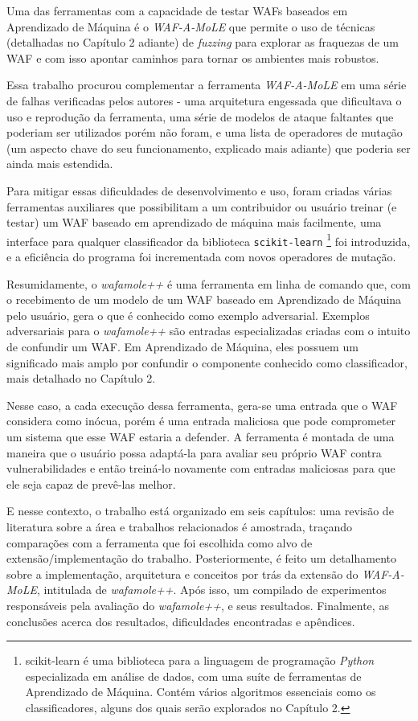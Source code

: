 Uma das ferramentas com a capacidade de testar WAFs baseados em Aprendizado de Máquina é o \textit{WAF-A-MoLE} \cite{valenza_waf--mole_2020} que permite o uso de técnicas (detalhadas no Capítulo 2 adiante) de \textit{fuzzing} \cite{fuzzing_book} para explorar as fraquezas de um WAF e com isso apontar caminhos para tornar os ambientes mais robustos.

Essa trabalho procurou complementar a ferramenta \textit{WAF-A-MoLE} em uma série de falhas verificadas pelos autores - uma arquitetura engessada que dificultava o uso e reprodução da ferramenta, uma série de modelos de ataque faltantes que poderiam ser utilizados porém não foram, e uma lista de operadores de mutação (um aspecto chave do seu funcionamento, explicado mais adiante) que poderia ser ainda mais estendida. 

Para mitigar essas dificuldades de desenvolvimento e uso, foram criadas várias ferramentas auxiliares que possibilitam a um contribuidor ou usuário treinar (e testar) um WAF baseado em aprendizado de máquina mais facilmente, uma interface para qualquer classificador da biblioteca \verb+scikit-learn+ \footnote{scikit-learn é uma biblioteca para a linguagem de programação \textit{Python} especializada em análise de dados, com uma suíte de ferramentas de Aprendizado de Máquina. Contém vários algoritmos essenciais como os classificadores, alguns dos quais serão explorados no Capítulo 2.} foi introduzida, e a eficiência do programa foi incrementada com novos operadores de mutação.

Resumidamente, o \textit{wafamole++} é uma ferramenta em linha de comando que, com o recebimento de um modelo de um WAF baseado em Aprendizado de Máquina pelo usuário, gera o que é conhecido como exemplo adversarial. Exemplos adversariais para o \textit{wafamole++} são entradas especializadas criadas com o intuito de confundir um WAF. Em Aprendizado de Máquina, eles possuem um significado mais amplo por confundir o componente conhecido como classificador, mais detalhado no Capítulo 2.

Nesse caso, a cada execução dessa ferramenta, gera-se uma entrada que o WAF considera como inócua, porém é uma entrada maliciosa que pode comprometer um sistema que esse WAF estaria a defender. A ferramenta é montada de uma maneira que o usuário possa adaptá-la para avaliar seu próprio WAF contra vulnerabilidades e então treiná-lo novamente com entradas maliciosas para que ele seja capaz de prevê-las melhor.

E nesse contexto, o trabalho está organizado em seis capítulos: uma revisão de literatura sobre a área e trabalhos relacionados é amostrada, traçando comparações com a ferramenta que foi escolhida como alvo de extensão/implementação do trabalho. Posteriormente, é feito um detalhamento sobre a implementação, arquitetura e conceitos por trás da extensão do \textit{WAF-A-MoLE}, intitulada de \textit{wafamole++}. Após isso, um compilado de experimentos responsáveis pela avaliação do \textit{wafamole++}, e seus resultados. Finalmente, as conclusões acerca dos resultados, dificuldades encontradas e apêndices.

\bigskip
